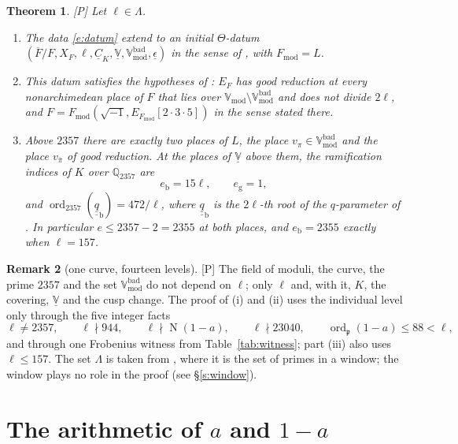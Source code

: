 \documentclass[11pt,a4paper]{article}
\newcommand{\Q}{\mathbb{Q}}
\newcommand{\Fmod}{F_{\mathrm{mod}}}
\newcommand{\Vbadmod}{\mathbb{V}^{\mathrm{bad}}_{\mathrm{mod}}}
\newcommand{\VV}{\underline{\mathbb{V}}}
\newcommand{\ord}{\operatorname{ord}}
\newcommand{\Nm}{\operatorname{N}}
\newcommand{\qq}{\underline{\underline{q}}}
\newcommand{\tP}{\textup{[P]}}
\theoremstyle{plain}
\newtheorem{theorem}{Theorem}[section]
\theoremstyle{definition}
\newtheorem{remark}[theorem]{Remark}
\begin{document}
\begin{theorem}\label{t:main}
\tP{} Let $\ell\in\Lambda$.
\begin{enumerate}[label=(\roman*)]
\item The data \eqref{e:datum} extend to an initial $\Theta$-datum
 $(\overline F/F,X_F,\ell,\underline C_K,\VV,\Vbadmod,\underline\epsilon)$ in the sense of \cite[Def.~3.1]{IUT1}, with
 $\Fmod=L$.
\item This datum satisfies the hypotheses of \cite[Thm.~1.10]{IUT4}: $E_F$ has good reduction at every
 nonarchimedean place of $F$ that lies over $\mathbb{V}_{\mathrm{mod}}\setminus\Vbadmod$ and does not divide $2\ell$, and
 $F=\Fmod(\sqrt{-1},E_{\Fmod}[2\cdot3\cdot5])$ in the sense stated there.
\item Above $2357$ there are exactly two places of $L$, the place $v_\pi\in\Vbadmod$ and the place $v_{\bar\pi}$ of good
 reduction. At the places of $\VV$ above them, the ramification indices of $K$ over $\Q_{2357}$ are
 \[
  e_{\mathrm b}=15\ell,\qquad e_{\mathrm g}=1,
 \]
 and $\ord_{2357}(\qq_{\mathrm b})=472/\ell$, where $\qq_{\mathrm b}$ is the $2\ell$-th root of the $q$-parameter of
 \cite[Example~3.2(iv)]{IUT1}. In particular $e\le2357-2=2355$ at both places, and $e_{\mathrm b}=2355$ exactly
 when $\ell=157$.
\end{enumerate}
\end{theorem}

\begin{remark}[one curve, fourteen levels]\label{r:uniform}
\tP{} The field of moduli, the curve, the prime $2357$ and the set $\Vbadmod$ do not depend on $\ell$; only $\ell$ and,
with it, $K$, the covering, $\VV$ and the cusp change. The proof of (i) and (ii) uses the individual level only
through the five integer facts
\[
 \ell\ne2357,\qquad \ell\nmid944,\qquad \ell\nmid\Nm(1-a),\qquad \ell\nmid23040,\qquad \ord_{\mathfrak p}(1-a)\le88<\ell,
\]
and through one Frobenius witness from Table~\ref{tab:witness}; part (iii) also uses $\ell\le157$. The set $\Lambda$ is taken from \cite[\S13]{Second},
where it is the set of primes in a window; the window plays no role in the proof (see \S\ref{s:window}).
\end{remark}

\section{The arithmetic of \texorpdfstring{$a$}{a} and \texorpdfstring{$1-a$}{1-a}}\label{s:arith}
\end{document}
